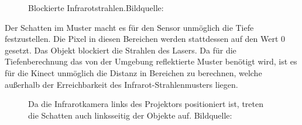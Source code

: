 \begin{figure}[!ht]
  \centering
   \caption{Blockierte Infrarotstrahlen.Bildquelle:\cite{kinectdepth}}
\end{figure}
Der Schatten im Muster macht es für den Sensor unmöglich die Tiefe festzustellen. Die Pixel in diesen Bereichen werden stattdessen auf den Wert 0 gesetzt.
Das Objekt blockiert die Strahlen des Lasers. Da für die Tiefenberechnung das von der Umgebung reflektierte Muster benötigt wird, ist es für die Kinect unmöglich die Distanz in Bereichen zu berechnen, welche außerhalb der Erreichbarkeit des Infrarot-Strahlenmusters liegen. 
\begin{figure}[!ht]
  \centering
   \caption{Da die Infrarotkamera links des Projektors positioniert ist, treten die Schatten auch linksseitig der Objekte auf. Bildquelle:\cite{kinectdepth}}
\end{figure}